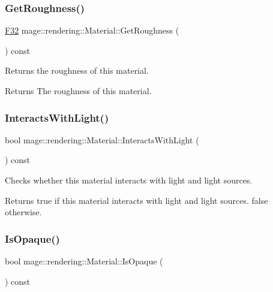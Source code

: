 \subsubsection{\texorpdfstring{Get\+Roughness()}{GetRoughness()}}
{\footnotesize\ttfamily \hyperlink{namespacemage_aa97e833b45f06d60a0a9c4fc22ae02c0}{F32} mage\+::rendering\+::\+Material\+::\+Get\+Roughness (\begin{DoxyParamCaption}{ }\end{DoxyParamCaption}) const\hspace{0.3cm}{\ttfamily [noexcept]}}

Returns the roughness of this material.

\begin{DoxyReturn}{Returns}
The roughness of this material. 
\end{DoxyReturn}
\hypertarget{classmage_1_1rendering_1_1_material_ac9ee80a246dd28e19a6e29065b8eb24d}{}\label{classmage_1_1rendering_1_1_material_ac9ee80a246dd28e19a6e29065b8eb24d} 
\subsubsection{\texorpdfstring{Interacts\+With\+Light()}{InteractsWithLight()}}
{\footnotesize\ttfamily bool mage\+::rendering\+::\+Material\+::\+Interacts\+With\+Light (\begin{DoxyParamCaption}{ }\end{DoxyParamCaption}) const\hspace{0.3cm}{\ttfamily [noexcept]}}

Checks whether this material interacts with light and light sources.

\begin{DoxyReturn}{Returns}
{\ttfamily true} if this material interacts with light and light sources. {\ttfamily false} otherwise. 
\end{DoxyReturn}
\hypertarget{classmage_1_1rendering_1_1_material_af750917e67bdaf7e47129617102887ab}{}\label{classmage_1_1rendering_1_1_material_af750917e67bdaf7e47129617102887ab} 
\subsubsection{\texorpdfstring{Is\+Opaque()}{IsOpaque()}}
{\footnotesize\ttfamily bool mage\+::rendering\+::\+Material\+::\+Is\+Opaque (\begin{DoxyParamCaption}{ }\end{DoxyParamCaption}) const\hspace{0.3cm}{\ttfamily [noexcept]}}

